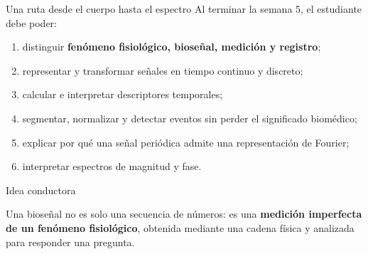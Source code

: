\documentclass[
  10pt,
  ignorenonframetext,
  aspectratio=169,
  spanish,
]{beamer}
\providecommand{\tightlist}{%
  \setlength{\itemsep}{0pt}\setlength{\parskip}{0pt}}
\begin{document}
\begin{frame}{Una ruta desde el cuerpo hasta el espectro}
\label{d1-003}
Al terminar la semana 5, el estudiante debe poder:

\begin{enumerate}
\tightlist
\item
  distinguir \textbf{fenómeno fisiológico, bioseñal, medición y
  registro};
\item
  representar y transformar señales en tiempo continuo y discreto;
\item
  calcular e interpretar descriptores temporales;
\item
  segmentar, normalizar y detectar eventos sin perder el significado
  biomédico;
\item
  explicar por qué una señal periódica admite una representación de
  Fourier;
\item
  interpretar espectros de magnitud y fase.
\end{enumerate}

\begin{block}{Idea conductora}

Una bioseñal no es solo una secuencia de números: es una
\textbf{medición imperfecta de un fenómeno fisiológico}, obtenida
mediante una cadena física y analizada para responder una pregunta.

\end{block}

\end{frame}
\end{document}
